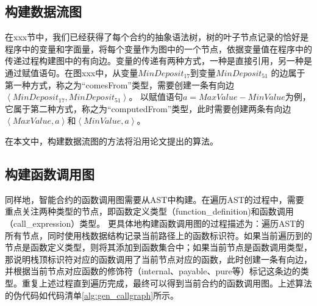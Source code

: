 \subsection{构建数据流图}
\label{sec:构建数据流图}
在xxx节中，我们已经获得了每个合约的抽象语法树，树的叶子节点记录的恰好是程序中的变量和字面量，将每个变量作为图中的一个节点，依据变量值在程序中的传递过程构建图中的有向边。变量的传递有两种方式，一种是直接引用，另一种是通过赋值语句。在图xxx中，从变量$MinDeposit_{17}$到变量$MinDeposit_{51}$ 的边属于第一种方式，称之为“comesFrom”类型，需要创建一条有向边$\left\langle MinDeposit_{17}, MinDeposit_{51}\right\rangle$。
以赋值语句$a=MaxValue-MinValue$为例，它属于第二种方式，称之为“computedFrom”类型，此时需要创建两条有向边$\left\langle MaxValue,a\right\rangle$和$\left\langle MinValue,a\right\rangle$。

在本文中，构建数据流图的方法将沿用论文\cite{wu2021peculiar}提出的算法。
\subsection{构建函数调用图}
\label{sec:构建函数调用图}
同样地，智能合约的函数调用图需要从AST中构建。在遍历AST的过程中，需要重点关注两种类型的节点，即函数定义类型（function\_definition)和函数调用（call\_expression）类型。
更具体地构建函数调用图的过程描述为：遍历AST的所有节点，同时使用栈数据结构记录当前路径上的函数标识符。如果当前遍历到的节点是函数定义类型，则将其添加到函数集合中；如果当前节点是函数调用类型，那说明栈顶标识符对应的函数调用了当前节点对应的函数，此时创建一条有向边，并根据当前节点对应函数的修饰符（internal、payable、pure等）标记这条边的类型。重复上述过程直到遍历完成，最终可以得到当前合约的函数调用图。上述算法的伪代码如代码清单\ref{alg:gen_callgraph}所示。


